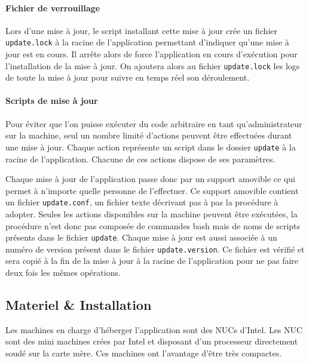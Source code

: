 \paragraph{Fichier de verrouillage} Lors d'une mise à jour, le script installant cette mise à jour crée un fichier \texttt{update.lock} à la racine de l'application permettant d'indiquer qu'une mise à jour est en cours.
Il arrête alors de force l'application en cours d'exécution pour l'installation de la mise à jour.
On ajoutera alors au fichier \texttt{update.lock} les logs de toute la mise à jour pour suivre en temps réel son déroulement.

\paragraph{Scripts de mise à jour} Pour éviter que l'on puisse exécuter du code arbitraire en tant qu'administrateur sur la machine, seul un nombre limité d'actions peuvent être effectuées durant une mise à jour.
Chaque action représente un script dans le dossier \texttt{update} à la racine de l'application.
Chacune de ces actions dispose de ses paramètres.

\medskip

Chaque mise à jour de l'application passe donc par un support amovible ce qui permet à n'importe quelle personne de l'effectuer.
Ce support amovible contient un fichier \texttt{update.conf}, un fichier texte décrivant pas à pas la procédure à adopter.
Seules les actions disponibles sur la machine peuvent être exécutées, la procédure n'est donc pas composée de commandes bash mais de noms de scripts présents dans le fichier \texttt{update}.
Chaque mise à jour est aussi associée à un numéro de version présent dans le fichier \texttt{update.version}.
Ce fichier est vérifié et sera copié à la fin de la mise à jour à la racine de l'application pour ne pas faire deux fois les mêmes opérations.

\subsection{Materiel \& Installation}

Les machines en charge d'héberger l'application sont des NUCs d'Intel.
Les NUC sont des mini machines crées par Intel et disposant d'un processeur directement soudé sur la carte mère.
Ces machines ont l'avantage d'être très compactes.

